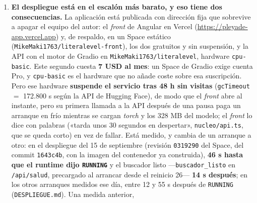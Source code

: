 \documentclass[11pt,a4paper]{article}
\newcommand{\cod}[1]{\texttt{\small #1}}
\begin{document}
\begin{enumerate}[leftmargin=*, itemsep=4pt]
        (\cod{MikeMaki1763/\allowbreak literalevel-v4}, repositorio público, descarga sin
        credenciales), así que el cuaderno se ejecuta de principio a fin y demuestra la
        inferencia sobre texto real. Ejecutado así el 16 de septiembre de 2026 en Colab, con
        CPU y cuenta gratuita, y con las salidas guardadas en el propio cuadernillo: 57 de 57
        celdas de código con salida y ningún error. El cuaderno no reentrena el v4, que
        pide una GPU, pero \textbf{sus métricas sí se recalculan fuera de él}: los datos de
        entrenamiento son
        públicos (ELG CEFR English, en Hugging Face), y el guion y las 144 parejas de nivel
        y predicción están en \cod{entrenamiento\_v4/}, que no viaja con los entregables y se
        comparte a petición. Recalculadas en CPU en menos de un minuto, dan las mismas cifras
        a cuatro decimales.
  \item \textbf{El despliegue está en el escalón más barato, y eso tiene dos
        consecuencias.} La aplicación está publicada con
        dirección fija que sobrevive a apagar el equipo del autor: el \emph{front} de
        Angular en Vercel (\url{https://pleyade-app.vercel.app}) y, de respaldo, en un Space
        estático (\cod{MikeMaki1763/\allowbreak literalevel-front}), los dos gratuitos y sin
        suspensión, y la API con el motor de Gradio en
        \cod{MikeMaki1763/\allowbreak literalevel}, hardware \cod{cpu-basic}. Este segundo
        cuesta \textbf{7 USD al mes}: un Space de Gradio exige cuenta Pro, y
        \cod{cpu-basic} es el hardware que no añade coste sobre esa suscripción. Pero ese
        hardware \textbf{suspende el servicio tras 48 h sin visitas} (\cod{gcTimeout} $=$
        172.800 s según la API de Hugging Face), de modo que el \emph{front} abre al
        instante, pero su primera llamada a la API después de una pausa paga un arranque
        en frío mientras se cargan \emph{torch} y los 328 MB del modelo; el \emph{front} lo
        dice con palabras («tarda unos 30 segundos en despertar», \cod{nucleo/api.ts},
        que se queda corto) en vez de fallar. Está medido, y cambia de un arranque a otro:
        en el despliegue del 15 de septiembre (revisión \cod{0319290} del Space, del commit \cod{1643c4b}, con la imagen del contenedor
        ya construida), \textbf{46 s hasta que el runtime dijo \cod{RUNNING}} y el buscador
        listo —\cod{buscador\_listo} en \cod{/api/salud}, precargado al arrancar desde el
        reinicio 26— \textbf{14 s después}; en los otros arranques medidos ese día, entre
        12 y 55 s después de \cod{RUNNING} (\cod{DESPLIEGUE.md}). Una medida anterior,

\end{enumerate}
\end{document}
